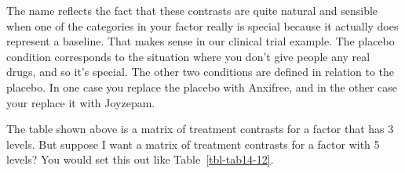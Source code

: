 \documentclass[
  a4paper,
]{book}
\begin{document}
The name reflects the fact that these contrasts are quite natural and
sensible when one of the categories in your factor really is special
because it actually does represent a baseline. That makes sense in our
clinical trial example. The placebo condition corresponds to the
situation where you don't give people any real drugs, and so it's
special. The other two conditions are defined in relation to the
placebo. In one case you replace the placebo with Anxifree, and in the
other case your replace it with Joyzepam.

The table shown above is a matrix of treatment contrasts for a factor
that has 3 levels. But suppose I want a matrix of treatment contrasts
for a factor with 5 levels? You would set this out like
Table~\ref{tbl-tab14-12}.

\hypertarget{tbl-tab14-12}{}
 
  \providecommand{\huxb}[2]{\arrayrulecolor[RGB]{#1}\global\arrayrulewidth=#2pt}
  \providecommand{\huxvb}[2]{\color[RGB]{#1}\vrule width #2pt}
  \providecommand{\huxtpad}[1]{\rule{0pt}{#1}}
  \providecommand{\huxbpad}[1]{\rule[-#1]{0pt}{#1}}
\end{document}
